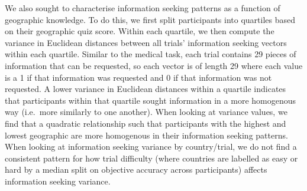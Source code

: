 \documentclass[a4paper, nobind]{templates/ociamthesis}
\begin{document}
We also sought to characterise information seeking patterns as a function of geographic knowledge. To do this, we first split participants into quartiles based on their geographic quiz score. Within each quartile, we then compute the variance in Euclidean distances between all trials' information seeking vectors within each quartile. Similar to the medical task, each trial contains 29 pieces of information that can be requested, so each vector is of length 29 where each value is a 1 if that information was requested and 0 if that information was not requested. A lower variance in Euclidean distances within a quartile indicates that participants within that quartile sought information in a more homogenous way (i.e.~more similarly to one another). When looking at variance values, we find that a quadratic relationship such that participants with the highest and lowest geographic are more homogenous in their information seeking patterns. When looking at information seeking variance by country/trial, we do not find a consistent pattern for how trial difficulty (where countries are labelled as easy or hard by a median split on objective accuracy across participants) affects information seeking variance.
\end{document}
